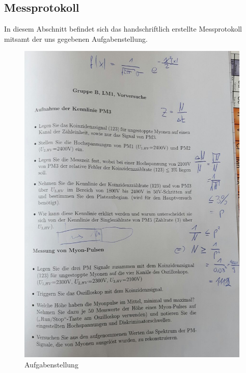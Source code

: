 \subsection{Messprotokoll}
In diesem Abschnitt befindet sich das handschriftlich erstellte Messprotokoll mitsamt der uns gegebenen Aufgabenstellung.\\
	\begin{figure}[ht]
					\centering
					\includegraphics[width = 1.\linewidth]{pic/aufgabe.jpg}
					\caption{Aufgabenstellung}
	\end{figure}
